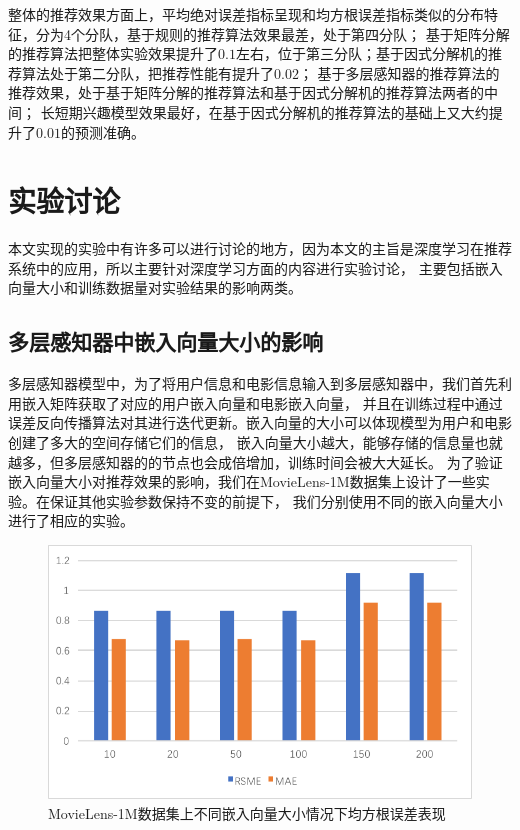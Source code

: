 整体的推荐效果方面上，平均绝对误差指标呈现和均方根误差指标类似的分布特征，分为4个分队，基于规则的推荐算法效果最差，处于第四分队；
基于矩阵分解的推荐算法把整体实验效果提升了$0.1$左右，位于第三分队；基于因式分解机的推荐算法处于第二分队，把推荐性能有提升了$0.02$；
基于多层感知器的推荐算法的推荐效果，处于基于矩阵分解的推荐算法和基于因式分解机的推荐算法两者的中间；
长短期兴趣模型效果最好，在基于因式分解机的推荐算法的基础上又大约提升了$0.01$的预测准确。

\section{实验讨论}
本文实现的实验中有许多可以进行讨论的地方，因为本文的主旨是深度学习在推荐系统中的应用，所以主要针对深度学习方面的内容进行实验讨论，
主要包括嵌入向量大小和训练数据量对实验结果的影响两类。

\subsection{多层感知器中嵌入向量大小的影响}
多层感知器模型中，为了将用户信息和电影信息输入到多层感知器中，我们首先利用嵌入矩阵获取了对应的用户嵌入向量和电影嵌入向量，
并且在训练过程中通过误差反向传播算法对其进行迭代更新。嵌入向量的大小可以体现模型为用户和电影创建了多大的空间存储它们的信息，
嵌入向量大小越大，能够存储的信息量也就越多，但多层感知器的的节点也会成倍增加，训练时间会被大大延长。
为了验证嵌入向量大小对推荐效果的影响，我们在MovieLens-1M数据集上设计了一些实验。在保证其他实验参数保持不变的前提下，
我们分别使用不同的嵌入向量大小进行了相应的实验。

\begin{figure}[htbp]
    \centering
    \includegraphics[scale=0.7]{images/UM.pdf}
    \caption{MovieLens-1M数据集上不同嵌入向量大小情况下均方根误差表现}
    \label{fig:um}
\end{figure}


